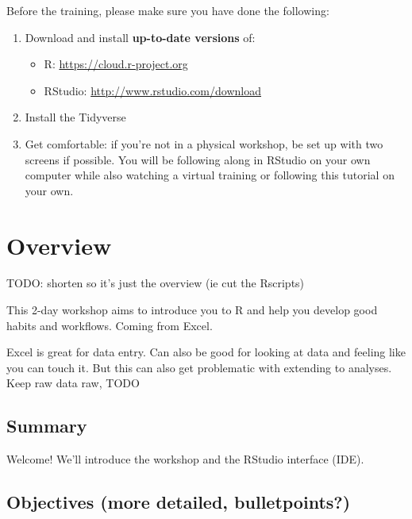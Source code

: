 \documentclass[]{book}
\providecommand{\tightlist}{%
  \setlength{\itemsep}{0pt}\setlength{\parskip}{0pt}}
\begin{document}
Before the training, please make sure you have done the following:

\begin{enumerate}
\def\labelenumi{\arabic{enumi}.}
\tightlist
\item
  Download and install \textbf{up-to-date versions} of:

  \begin{itemize}
  \tightlist
  \item
    R: \url{https://cloud.r-project.org}
  \item
    RStudio: \url{http://www.rstudio.com/download}
  \end{itemize}
\item
  Install the Tidyverse
  \\
\item
  Get comfortable: if you're not in a physical workshop, be set up with two screens if possible. You will be following along in RStudio on your own computer while also watching a virtual training or following this tutorial on your own.
\end{enumerate}

\hypertarget{overview}{%
\chapter{Overview}\label{overview}}

TODO: shorten so it's just the overview (ie cut the Rscripts)

This 2-day workshop aims to introduce you to R and help you develop good habits and workflows.
Coming from Excel.

Excel is great for data entry. Can also be good for looking at data and feeling like you can touch it. But this can also get problematic with extending to analyses. Keep raw data raw, TODO

\hypertarget{summary}{%
\section{Summary}\label{summary}}

Welcome! We'll introduce the workshop and the RStudio interface (IDE).

\hypertarget{objectives-more-detailed-bulletpoints}{%
\section{Objectives (more detailed, bulletpoints?)}\label{objectives-more-detailed-bulletpoints}}
\end{document}

